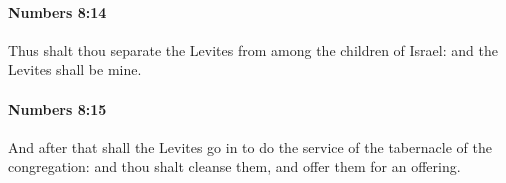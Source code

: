 		\paragraph{Numbers 8:14} %
			\label{NUMBERS-8-14}

			Thus shalt thou separate the Levites from among the children of Israel: and the Levites shall be mine.


		\paragraph{Numbers 8:15} %
			\label{NUMBERS-8-15}

			And after that shall the Levites go in to do the service of the tabernacle of the congregation: and thou shalt cleanse them, and offer them for an offering.


